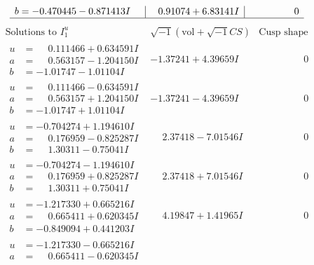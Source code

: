 \documentclass[1p]{elsarticle_modified}
\theoremstyle{definition}
\newcommand{\I}{\sqrt{-1}}
\begin{document}
$$\begin{array}{c|c|c}
\begin{aligned}
b &= -0.470445 - 0.871413 I\end{aligned}
 & \phantom{-}0.91074 + 6.83141 I & \phantom{-0.000000 } 0\\
 \hline 
 \end{array}$$\newpage$$\begin{array}{c|c|c}  
\text{Solutions to }I^u_{1}& \I (\text{vol} + \sqrt{-1}CS) & \text{Cusp shape}\\
 \hline 
\begin{aligned}
u &= \phantom{-}0.111466 + 0.634591 I \\
a &= \phantom{-}0.563157 - 1.204150 I \\
b &= -1.01747 - 1.01104 I\end{aligned}
 & -1.37241 + 4.39659 I & \phantom{-0.000000 } 0 \\ \hline\begin{aligned}
u &= \phantom{-}0.111466 - 0.634591 I \\
a &= \phantom{-}0.563157 + 1.204150 I \\
b &= -1.01747 + 1.01104 I\end{aligned}
 & -1.37241 - 4.39659 I & \phantom{-0.000000 } 0 \\ \hline\begin{aligned}
u &= -0.704274 + 1.194610 I \\
a &= \phantom{-}0.176959 - 0.825287 I \\
b &= \phantom{-}1.30311 - 0.75041 I\end{aligned}
 & \phantom{-}2.37418 - 7.01546 I & \phantom{-0.000000 } 0 \\ \hline\begin{aligned}
u &= -0.704274 - 1.194610 I \\
a &= \phantom{-}0.176959 + 0.825287 I \\
b &= \phantom{-}1.30311 + 0.75041 I\end{aligned}
 & \phantom{-}2.37418 + 7.01546 I & \phantom{-0.000000 } 0 \\ \hline\begin{aligned}
u &= -1.217330 + 0.665216 I \\
a &= \phantom{-}0.665411 + 0.620345 I \\
b &= -0.849094 + 0.441203 I\end{aligned}
 & \phantom{-}4.19847 + 1.41965 I & \phantom{-0.000000 } 0 \\ \hline\begin{aligned}
u &= -1.217330 - 0.665216 I \\
a &= \phantom{-}0.665411 - 0.620345 I \\

\end{aligned}
\end{array}$$
\end{document}
